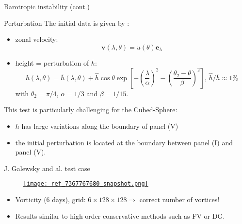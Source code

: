 \documentclass[11pt]{beamer}
\begin{document}
\begin{frame}{Barotropic instability (cont.)}
\begin{block}{Perturbation}
The initial data is given by :
\begin{itemize}
\item zonal velocity:
$$\mathbf{v}(\lambda,\theta) = u(\theta) \mathbf{e}_{\lambda}$$
\item height = perturbation of $\bar{h}$:
$$h(\lambda,\theta) = \bar{h}(\lambda,\theta) + \hat{h} \cos \theta \exp \left[ - \left( \dfrac{\lambda}{\alpha} \right)^2 - \left( \dfrac{\theta_2 - \theta}{\beta} \right)^2 \right] \text{, } \hat{h}/\bar{h} \approx 1 \%$$
with $\theta_2 = \pi/4$, $\alpha = 1/3$ and $\beta = 1/15$.
\end{itemize}
\end{block}

\begin{block}{}
This test is particularly challenging for the Cubed-Sphere:

\begin{itemize}
\item $h$ has large variations along the boundary of panel (V)
\item the initial perturbation is located at the boundary between panel (I) and panel (V).
\end{itemize}
\end{block}
\end{frame}


\begin{frame}{J. Galewsky and al. test case}
\begin{figure}
\href{run:ref_7367787500.avi}{\texttt{[image: ref\_7367767680\_snapshot.png]}} 
\end{figure}
\begin{itemize}
\item Vorticity (6 days), grid: $6 \times 128 \times 128 \Rightarrow $ correct number of vortices!
\item Results similar to high order conservative methods such as FV or DG.
\end{itemize}
\end{frame}

\end{document}
